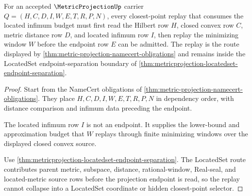 \begin{theorem}\label{thm:metric-projection-obligation-located-infimum-replay}
For an accepted $\MetricProjectionUp$ carrier $Q=(H,C,D,I,W,E,T,R,P,N)$, every closest-point replay that consumes the located infimum budget must first read the Hilbert row $H$, closed convex row $C$, metric distance row $D$, and located infimum row $I$, then replay the minimizing window $W$ before the endpoint row $E$ can be admitted. The replay is the route displayed by \autoref{thm:metric-projection-namecert-obligations} and remains inside the LocatedSet endpoint-separation boundary of \autoref{thm:metricprojection-locatedset-endpoint-separation}.
\end{theorem}
\begin{proof}
Start from the NameCert obligations of \autoref{thm:metric-projection-namecert-obligations}. They place $H,C,D,I,W,E,T,R,P,N$ in dependency order, with distance comparison and infimum data preceding the endpoint.

The located infimum row $I$ is not an endpoint. It supplies the lower-bound and approximation budget that $W$ replays through finite minimizing windows over the displayed closed convex source.

Use \autoref{thm:metricprojection-locatedset-endpoint-separation}. The LocatedSet route contributes parent metric, subspace, distance, rational-window, Real-seal, and located-metric source rows before the projection endpoint is read, so the replay cannot collapse into a LocatedSet coordinate or hidden closest-point selector.
\end{proof}

